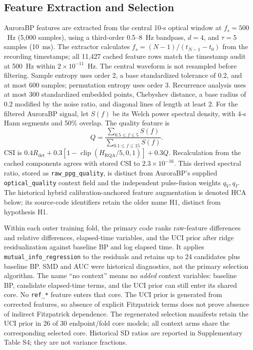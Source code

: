 \documentclass[journal]{IEEEtran}
\begin{document}
\subsection{Feature Extraction and Selection}
\label{sec:features}
AuroraBP features are extracted from the central 10-s optical window at $f_s=500$~Hz (5{,}000 samples), using a third-order 0.5--8~Hz bandpass, $d=4$, and $\tau=5$ samples (10~ms). The extractor calculates $f_s=(N-1)/(t_{N-1}-t_0)$ from the recording timestamps; all 11{,}427 cached feature rows match the timestamp audit at 500~Hz within $2\times10^{-11}$~Hz. The central waveform is not resampled before filtering. Sample entropy uses order 2, a base standardized tolerance of 0.2, and at most 600 samples; permutation entropy uses order 3. Recurrence analysis uses at most 300 standardized embedded points, Chebyshev distance, a base radius of 0.2 modified by the noise ratio, and diagonal lines of length at least 2. For the filtered AuroraBP signal, let $S(f)$ be its Welch power spectral density, with 4-s Hann segments and 50\% overlap. The quality feature is
\begin{equation}
Q=\frac{\sum_{0.5\le f\le5}S(f)}{\sum_{0.1\le f\le15}S(f)}.
\label{eq:auroraquality}
\end{equation}
CSI is $0.4R_{\mathrm{det}}+0.3[1-\operatorname{clip}(H_{\mathrm{RQA}}/5,0,1)]+0.3Q$. Recalculation from the cached components agrees with stored CSI to $2.3\times10^{-16}$. This derived spectral ratio, stored as \texttt{raw\_ppg\_quality}, is distinct from AuroraBP's supplied \texttt{optical\_quality} context field and the independent pulse-fusion weights $q_V,q_I$. The historical hybrid calibration-anchored feature augmentation is denoted HCA below; its source-code identifiers retain the older name H1, distinct from hypothesis H1.

Within each outer training fold, the primary code ranks raw-feature differences and relative differences, elapsed-time variables, and the UCI prior after ridge residualization against baseline BP and log elapsed time. It applies \texttt{mutual\_info\_regression} to the residuals and retains up to 24 candidates plus baseline BP. SMD and AUC were historical diagnostics, not the primary selection algorithm. The name ``no context'' means no \emph{added} context variables: baseline BP, candidate elapsed-time terms, and the UCI prior can still enter its shared core. No \texttt{ref\_*} feature enters that core. The UCI prior is generated from corrected features, so absence of explicit Fitzpatrick terms does not prove absence of indirect Fitzpatrick dependence. The regenerated selection manifests retain the UCI prior in 26 of 30 endpoint/fold core models; all context arms share the corresponding selected core. Historical SD ratios are reported in Supplementary Table S4; they are not variance fractions.
\end{document}
